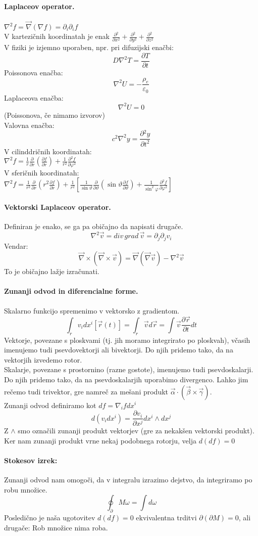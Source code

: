 \documentclass[a4paper]{article}
\newcommand{\vct}[1]{\overrightarrow{#1}}
\newcommand{\pd}[2]{\frac{\partial {#1}}{\partial {#2}}}
\begin{document}
\paragraph{Laplaceov operator.} $\displaystyle{\nabla^2f = \vct\nabla (\nabla f) = \partial_i\partial_if}$ \\
V kartezičnih koordinatah je enak $\displaystyle{\pd{^2}{x^2} + \pd{^2}{y^2} + \pd{^2}{z^2}}$ \\
V fiziki je izjemno uporaben, npr. pri difuzijski enačbi:
$$D\nabla^2T = \pd{T}{t}$$
Poissonova enačba:
$$\nabla^2U = -\frac{\rho_e}{\varepsilon_0}$$
Laplaceova enačba:
$$\nabla^2U = 0$$
(Poissonova, če nimamo izvorov) \\[4mm]
Valovna enačba:
$$c^2\nabla^2y = \pd{^2y}{t^2}$$
V cilinddričnih koordinatah: \\
$\displaystyle{\nabla^2f = \frac{1}{r}\pd{}{r}\left(\pd{f}{r}\right) + \frac{1}{r^2}\pd{^2f}{\varphi^2}}$ \\
V sferičnih koordinatah: \\
$\displaystyle{\nabla^2f = \frac{1}{r^2}\pd{}{r}\left(r^2\pd{f}{r}\right) + \frac{1}{r^2}\left[\frac{1}{\sin\vartheta}\pd{}{\vartheta}\left(\sin\vartheta\pd{f}{\vartheta}\right)+ \frac{1}{\sin^2\varphi}\pd{^2f}{\varphi^2}\right]}$ \\
\paragraph{Vektorski Laplaceov operator.} Definiran je enako, se ga pa običajno da napisati drugače.
$$\nabla^2\vct{v} = div\,grad\,\vct{v} = \partial_j\partial_jv_i$$
Vendar:
$$\vct\nabla \times (\vct\nabla \times \vct{v}) = \vct\nabla(\vct\nabla\vct{v}) - \nabla^2\vct{v}$$
To je običajno lažje izračunati.
\paragraph{Zunanji odvod in diferencialne forme.} Skalarno funkcijo spremenimo v vektorsko z gradientom.
$$\int_{r} v_idx^i[\vct{r}(t)] = \int_{r}\vct{v}d\vct{r} = \int\vct{v}\pd{\vct{r}}{t}dt$$
Vektorje, povezane s ploskvami (tj. jih moramo integrirato po ploskvah), včasih imenujemo tudi psevdovektorji ali bivektorji. Do njih pridemo tako, da na vektorjih izvedemo rotor. \\[4mm]
Skalarje, povezane s prostornino (razne gostote), imenujemo tudi psevdoskalarji. Do njih pridemo tako, da na psevdoskalarjih uporabimo divergenco. Lahko jim rečemo tudi trivektor, gre namreč za mešani produkt $\vct\alpha\cdot(\vct\beta\times\vct\gamma)$. \\[4mm]
Zunanji odvod definiramo kot $df = \nabla_ifdx^i$
$$d(v_idx^i) = \pd{v_i}{x^j}dx^i\wedge dx^j$$
Z $\wedge$ smo označili zunanji produkt vektorjev (gre za nekakšen vektorski produkt).
Ker nam zunanji produkt vrne nekaj podobnega rotorju, velja $d(df) = 0$
\paragraph{Stokesov izrek:} Zunanji odvod nam omogoči, da v integralu izrazimo dejstvo, da integriramo po robu množice.
$$\oint_\partial M\omega = \int d\omega$$
Posledično je naša ugotovitev $d(df) = 0$ ekvivalentna trditvi $\partial(\partial M) = 0$, ali drugače: Rob množice nima roba.
\end{document}
